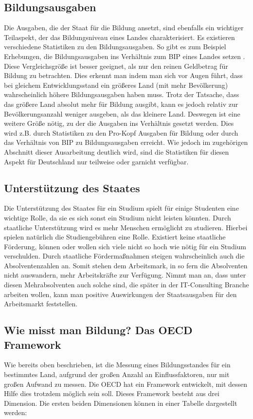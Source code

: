 \subsection*{Bildungsausgaben}
Die Ausgaben, die der Staat für die Bildung ansetzt, sind ebenfalls ein wichtiger Teilaspekt, der das Bildungsniveau eines Landes charakterisiert.
Es existieren verschiedene Statistiken zu den Bildungsausgaben. So gibt es zum Beispiel Erhebungen, die Bildungsausgaben ins Verhältnis zum BIP eines Landes setzen \cite[6]{oecd2} \cite{bip}. Diese Vergleichsgröße ist besser geeignet, als nur den reinen Geldbetrag für Bildung zu betrachten. Dies erkennt man indem man sich vor Augen führt, dass bei gleichem Entwicklungsstand ein größeres Land (mit mehr Bevölkerung) wahrscheinlich höhere Bildungsausgaben haben muss. Trotz der Tatsache,  dass das größere Land absolut mehr für Bildung ausgibt, kann es jedoch relativ zur Bevölkerungsanzahl weniger ausgeben, als das kleinere Land. Deswegen ist eine weitere Größe nötig, zu der die Ausgaben ins Verhältnis gesetzt werden. Dies wird z.B. durch Statistiken zu den Pro-Kopf Ausgaben für Bildung \cite[4]{oecd2} oder durch das Verhältnis von BIP zu Bildungsausgaben erreicht. Wie jedoch im zugehörigen Abschnitt dieser Ausarbeitung deutlich wird, sind die Statistiken für diesen Aspekt für Deutschland nur teilweise oder garnicht verfügbar.

\subsection*{Unterstützung des Staates} 
Die Unterstützung des Staates für ein Studium spielt für einige Studenten eine wichtige Rolle, da sie es sich sonst ein Studium nicht leisten könnten. Durch staatliche Unterstützung wird es mehr Menschen ermöglicht zu studieren. Hierbei spielen natürlich die Studiengebühren eine Rolle. Existiert keine staatliche Förderung, können oder wollen sich viele nicht so hoch wie nötig für ein Studium verschulden. Durch staatliche Fördermaßnahmen steigen wahrscheinlich auch die Absolventenzahlen an. Somit stehen dem Arbeitsmark, in so fern die Absolventen nicht auswandern, mehr Arbeitskräfte zur Verfügung. Nimmt man an, dass unter diesen Mehrabsolventen auch solche sind, die später in der IT-Consulting Branche arbeiten wollen, kann man positive Auswirkungen der Staatsausgaben für den Arbeitsmarkt feststellen.

\subsection*{Wie misst man Bildung? Das OECD Framework}
Wie bereits oben beschrieben, ist die Messung eines Bildungsstandes für ein bestimmtes Land, aufgrund der großen Anzahl an Einflussfaktoren, nur mit großen Aufwand zu messen. Die OECD hat ein Framework entwickelt, mit dessen Hilfe dies trotzdem möglich sein soll. Dieses Framework besteht aus drei Dimension. Die ersten beiden Dimensionen können in einer Tabelle dargestellt werden:

